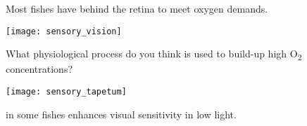 \label{key}\documentclass[t]{beamer}
\begin{document}
\begin{frame}[t]{Most fishes have  behind the retina to meet oxygen demands.}

\vspace{-\baselineskip}

\begin{multicols}{2}
\texttt{[image: sensory\_vision]}

\columnbreak

What physiological process do you think is used to build-up high O\textsubscript{2} concentrations?

\vspace{2\baselineskip}

\texttt{[image: sensory\_tapetum]}

\vspace{0.2\baselineskip}

 in some fishes enhances visual sensitivity in low light.


\end{multicols}

\end{frame}
\end{document}
